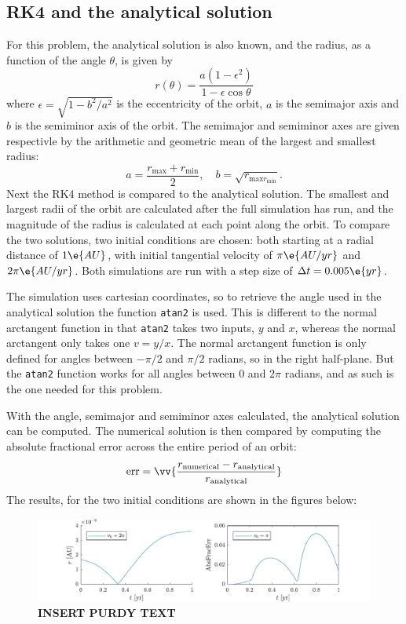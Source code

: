 \documentclass[a4paper,10pt]{article} 	%
\numberwithin{equation}{section}
\begin{document}
	\subsection{RK4 and the analytical solution}
	For this problem, the analytical solution is also known, and the radius, as a function of the angle $ \theta $, is given by
	\begin{equation}
		r(\theta) = \frac{a(1-\epsilon^2)}{1-\epsilon \cos \theta}
	\end{equation}
	where $ \epsilon = \sqrt{1-b^2/a^2}$ is the eccentricity of the orbit, $ a $ is the semimajor axis and $ b $ is the semiminor axis of the orbit. The semimajor and semiminor axes are given respectivle by the arithmetic and geometric mean of the largest and smallest radius:
	\begin{equation}
		a = \frac{r_{\text{max}}+r_{\text{min}}}{2}, \quad b = \sqrt{r_{\text{max}r_{\text{min}}}}.
	\end{equation}
	Next the RK4 method is compared to the analytical solution. The smallest and largest radii of the orbit are calculated after the full simulation has run, and the magnitude of the radius is calculated at each point along the orbit. To compare the two solutions, two initial conditions are chosen: both starting at a radial distance of $ 1 \e{AU} $, with initial tangential velocity of $ \pi \e{AU/yr} $ and $ 2 \pi \e{AU/yr} $. Both simulations are run with a step size of $ \Delta t  = 0.005 \e{yr} $.
	
	The simulation uses cartesian coordinates, so to retrieve the angle used in the analytical solution the function \texttt{atan2} is used. This is different to the normal arctangent function in that \texttt{atan2} takes two inputs, $ y $ and $ x $, whereas the normal arctangent only takes one $ v = y/x $. The normal arctangent function is only defined for angles between $ -\pi/2 $ and $ \pi/2 $ radians, so in the right half-plane. But the \texttt{atan2} function works for all angles between $ 0 $ and $ 2\pi $ radians, and as such is the one needed for this problem.
	
	With the angle, semimajor and semiminor axes calculated, the analytical solution can be computed. The numerical solution is then compared by computing the absolute fractional error across the entire period of an orbit:
	\begin{equation}
		\text{err} = \vv{\frac{r_{\text{numerical}}-r_{\text{analytical}}}{r_{\text{analytical}}}}
	\end{equation}
	The results, for the two initial conditions are shown in the figures below:
	\begin{figure}[H]
		\centering
		\includegraphics[width = \linewidth]{KeplerFracErr.pdf}
		\caption{\textbf{INSERT PURDY TEXT}}
		\label{fig:KeplerAnalytical}
	\end{figure}
\end{document}
